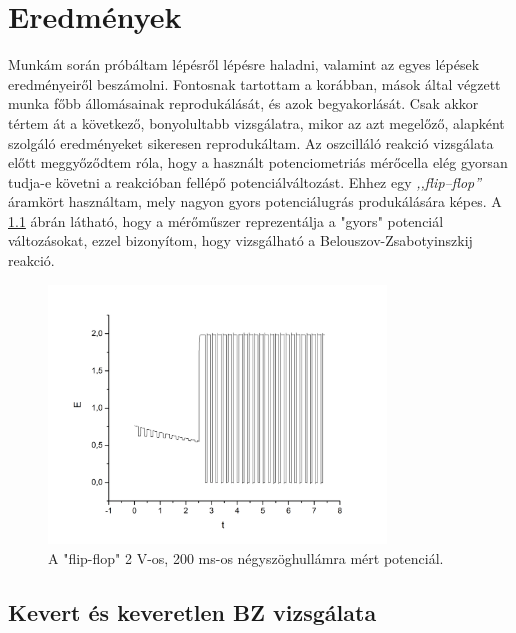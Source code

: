 \chapter{Eredmények}
\pagestyle{headings}

\def\s{0.5}
Munkám során próbáltam lépésről lépésre haladni, valamint az egyes lépések eredményeiről beszámolni. Fontosnak tartottam a korábban, mások által végzett munka főbb állomásainak reprodukálását, és azok begyakorlását. Csak akkor tértem át a következő, bonyolultabb vizsgálatra, mikor az azt megelőző, alapként szolgáló eredményeket sikeresen reprodukáltam. Az oszcilláló reakció vizsgálata előtt meggyőződtem róla, hogy a használt potenciometriás mérőcella elég gyorsan tudja-e követni a reakcióban fellépő potenciálváltozást. Ehhez egy \emph{,,flip--flop''} áramkört használtam, mely nagyon gyors potenciálugrás produkálására képes. A \ref{fig:square} ábrán látható, hogy a mérőműszer reprezentálja a "gyors" potenciál változásokat, ezzel bizonyítom, hogy vizsgálható a Belouszov-Zsabotyinszkij reakció.

\begin{figure}
\centering
\includegraphics[width=0.8\textwidth]{img/square.jpg}
\caption{A "flip-flop" 2 V-os, 200 ms-os négyszöghullámra mért potenciál.}
\label{fig:square}
\end{figure}

\section{Kevert és keveretlen BZ vizsgálata}
